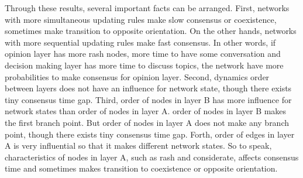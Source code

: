 Through these results, several important facts can be arranged. First, networks with more simultaneous updating rules make slow consensus or coexistence, sometimes make transition to opposite orientation. On the other hands, networks with more sequential updating rules make fast consensus. In other words, if opinion layer has more rash nodes, more time to have some conversation and decision making layer has more time to  discuss topics, the network have more probabilities to make consensus for opinion layer. Second, dynamics order between layers does not have an influence for network state, though there exists tiny consensus time gap. Third, order of nodes in layer B has more influence for network states than order of nodes in layer A. order of nodes in layer B makes the first branch point. But order of nodes in layer A does not make any branch point, though there exists tiny consensus time gap. Forth, order of edges in layer A is very influential so that it makes different network states. So to speak, characteristics of nodes in layer A, such as rash and considerate, affects consensus time and sometimes makes transition to coexistence or opposite orientation. 

